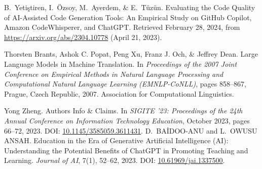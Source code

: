 \documentclass[12pt,a4paper]{book}
\begin{document}
\begin{thebibliography}{9}
B.~Yetiştiren, I.~Özsoy, M.~Ayerdem, \& E.~Tüzün.
\newblock Evaluating the Code Quality of AI-Assisted Code Generation Tools: An Empirical Study on GitHub Copilot, Amazon CodeWhisperer, and ChatGPT.
\newblock Retrieved February 28, 2024, from \url{https://arxiv.org/abs/2304.10778} (April 21, 2023).

Thorsten Brants, Ashok C. Popat, Peng Xu, Franz J. Och, \& Jeffrey Dean.
\newblock Large Language Models in Machine Translation.
\newblock In \textit{Proceedings of the 2007 Joint Conference on Empirical Methods in Natural Language Processing and Computational Natural Language Learning (EMNLP-CoNLL)}, pages 858--867, Prague, Czech Republic, 2007. Association for Computational Linguistics.

Yong Zheng.
\newblock Authors Info \& Claims.
\newblock In \textit{SIGITE '23: Proceedings of the 24th Annual Conference on Information Technology Education}, October 2023, pages 66--72, 2023. DOI: \url{10.1145/3585059.3611431}.
D.~BAİDOO-ANU and L.~OWUSU ANSAH.
\newblock Education in the Era of Generative Artificial Intelligence (AI): Understanding the Potential Benefits of ChatGPT in Promoting Teaching and Learning.
\newblock \textit{Journal of AI}, 7(1), 52--62, 2023. DOI: \url{10.61969/jai.1337500}.

\end{thebibliography}
\end{document}
